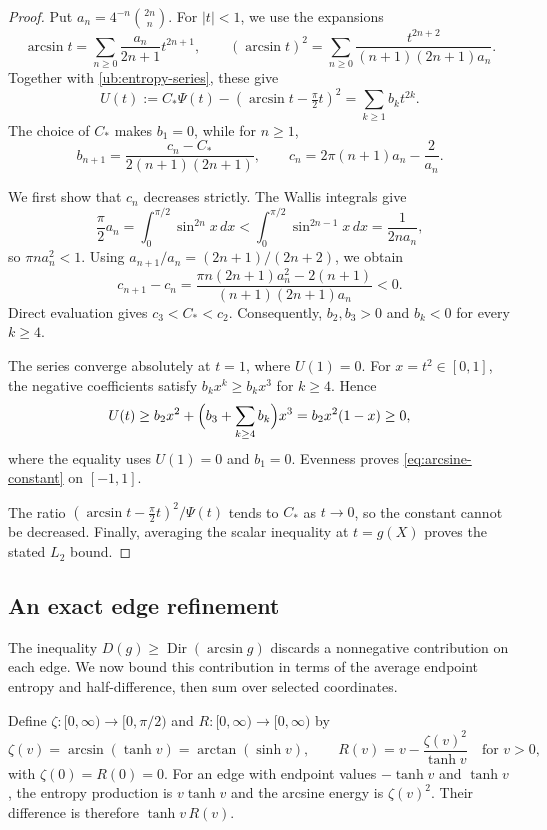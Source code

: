\documentclass[11pt,letterpaper]{amsart}
\newcommand{\1}{\mathbf 1}
\numberwithin{equation}{section}
\begin{document}
\begin{proof}
Put $a_n=4^{-n}\binom{2n}{n}$.
For $|t|<1$, we use the expansions
\[
 \arcsin t=\sum_{n\ge0}\frac{a_n}{2n+1}t^{2n+1},
 \qquad
 (\arcsin t)^2
 =\sum_{n\ge0}
   \frac{t^{2n+2}}{(n+1)(2n+1)a_n}.
\]
Together with \eqref{ub:entropy-series}, these give
\[
 U(t):=C_*\Psi(t)-(\arcsin t-\tfrac{\pi}{2}t)^2
      =\sum_{k\ge1}b_kt^{2k}.
\]
The choice of $C_*$ makes $b_1=0$, while for $n\ge1$,
\begin{equation}\label{fh:error-coefficients}
 b_{n+1}=\frac{c_n-C_*}{2(n+1)(2n+1)},
 \qquad
 c_n=2\pi(n+1)a_n-\frac2{a_n}.
\end{equation}

We first show that $c_n$ decreases strictly.
The Wallis integrals give
\[
 \frac{\pi}{2}a_n
 =\int_0^{\pi/2}\sin^{2n}x\,dx
 <\int_0^{\pi/2}\sin^{2n-1}x\,dx
 =\frac1{2na_n},
\]
so $\pi n a_n^2<1$.
Using $a_{n+1}/a_n=(2n+1)/(2n+2)$, we obtain
\[
 c_{n+1}-c_n
 =\frac{\pi n(2n+1)a_n^2-2(n+1)}
        {(n+1)(2n+1)a_n}<0.
\]
Direct evaluation gives $c_3<C_*<c_2$.
Consequently, $b_2,b_3>0$ and $b_k<0$ for every $k\ge4$.

The series converge absolutely at $t=1$, where $U(1)=0$.
For $x=t^2\in[0,1]$, the negative coefficients satisfy
$b_kx^k\ge b_kx^3$ for $k\ge4$.
Hence
\[
 U(t)\ge b_2x^2+
       \Bigl(b_3+\sum_{k\ge4}b_k\Bigr)x^3=b_2x^2(1-x)\ge0,
\]
where the equality uses $U(1)=0$ and $b_1=0$.
Evenness proves \eqref{eq:arcsine-constant} on $[-1,1]$.

The ratio
$(\arcsin t-\frac{\pi}{2}t)^2/\Psi(t)$ tends to $C_*$
as $t\to0$, so the constant cannot be decreased.
Finally, averaging the scalar inequality at $t=g(X)$
proves the stated $L_2$ bound.
\end{proof}

\subsection{An exact edge refinement}

The inequality $D(g)\ge\operatorname{Dir}(\arcsin g)$ discards
a nonnegative contribution on each edge.
We now bound this contribution in terms of the average endpoint
entropy and half-difference, then sum over selected coordinates.

Define $\zeta:[0,\infty)\to[0,\pi/2)$ and
$R:[0,\infty)\to[0,\infty)$ by
\begin{equation}\label{eq:arcsine-remainder}
 \zeta(v)=\arcsin(\tanh v)=\arctan(\sinh v),
 \qquad
 R(v)=v-\frac{\zeta(v)^2}{\tanh v}
 \quad \text{for } v>0,
\end{equation}
with $\zeta(0)=R(0)=0$.
For an edge with endpoint values $-\tanh v$ and $\tanh v$,
the entropy production is $v\tanh v$ and the arcsine energy
is $\zeta(v)^2$. Their difference is therefore $\tanh v\,R(v)$.
\end{document}
